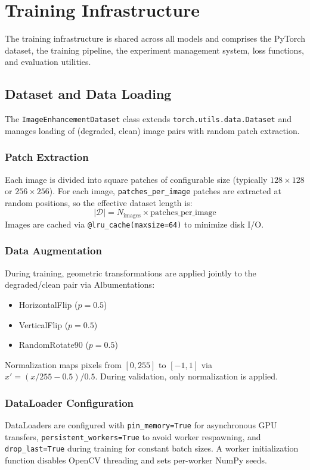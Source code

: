 \section{Training Infrastructure}
\label{sec:infrastructure}

The training infrastructure is shared across all models and comprises the PyTorch dataset, the training pipeline, the experiment management system, loss functions, and evaluation utilities.

\subsection{Dataset and Data Loading}

The \texttt{Image\-Enhancement\-Dataset} class extends \texttt{torch.\allowbreak{}utils.\allowbreak{}data.\allowbreak{}Dataset} and manages loading of (degraded, clean) image pairs with random patch extraction.

\subsubsection{Patch Extraction}
Each image is divided into square patches of configurable size (typically $128\!\times\!128$ or $256\!\times\!256$). For each image, \texttt{patches\_per\_image} patches are extracted at random positions, so the effective dataset length is:
\begin{equation}
|\mathcal{D}| = N_{\text{images}} \times \text{patches\_per\_image}
\end{equation}
Images are cached via \texttt{@lru\_cache(maxsize=64)} to minimize disk I/O.

\subsubsection{Data Augmentation}
During training, geometric transformations are applied jointly to the degraded/clean pair via Albumentations:
\begin{itemize}
    \item HorizontalFlip ($p = 0.5$)
    \item VerticalFlip ($p = 0.5$)
    \item RandomRotate90 ($p = 0.5$)
\end{itemize}
Normalization maps pixels from $[0, 255]$ to $[-1, 1]$ via $x' = (x/255 - 0.5)/0.5$. During validation, only normalization is applied.

\subsubsection{DataLoader Configuration}
DataLoaders are configured with \texttt{pin\_memory=True} for asynchronous GPU transfers, \texttt{persistent\_workers=True} to avoid worker respawning, and \texttt{drop\_last=True} during training for constant batch sizes. A worker initialization function disables OpenCV threading and sets per-worker NumPy seeds.

